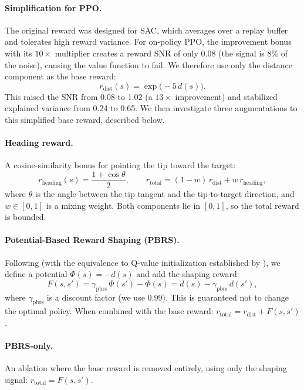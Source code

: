 \documentclass[11pt]{article}
\begin{document}
\paragraph{Simplification for PPO.}
The original reward was designed for SAC, which averages over a replay buffer and tolerates high reward variance.
For on-policy PPO, the improvement bonus with its $10{\times}$ multiplier creates a reward SNR of only 0.08 (the signal is 8\% of the noise), causing the value function to fail.
We therefore use only the distance component as the base reward:
\begin{equation}
  r_{\text{dist}}(s) = \exp\!\bigl(-5\,d(s)\bigr).
  \label{eq:reward-dist}
\end{equation}
This raised the SNR from 0.08 to 1.02 (a $13{\times}$ improvement) and stabilized explained variance from 0.24 to 0.65.
We then investigate three augmentations to this simplified base reward, described below.

\paragraph{Heading reward.}
A cosine-similarity bonus for pointing the tip toward the target:
\begin{equation}
  r_{\text{heading}}(s) = \frac{1 + \cos\theta}{2}, \qquad
  r_{\text{total}} = (1-w)\,r_{\text{dist}} + w\,r_{\text{heading}},
  \label{eq:reward-heading}
\end{equation}
where $\theta$ is the angle between the tip tangent and the tip-to-target direction, and $w \in [0,1]$ is a mixing weight.
Both components lie in $[0,1]$, so the total reward is bounded.

\paragraph{Potential-Based Reward Shaping (PBRS).}
Following \citet{Ng1999} (with the equivalence to Q-value initialization established by \citet{Wiewiora2003}), we define a potential $\Phi(s) = -d(s)$ and add the shaping reward:
\begin{equation}
  F(s, s') = \gamma_{\text{pbrs}}\,\Phi(s') - \Phi(s) = d(s) - \gamma_{\text{pbrs}}\,d(s'),
  \label{eq:pbrs}
\end{equation}
where $\gamma_{\text{pbrs}}$ is a discount factor (we use 0.99).
This is guaranteed not to change the optimal policy.
When combined with the base reward: $r_{\text{total}} = r_{\text{dist}} + F(s,s')$.

\paragraph{PBRS-only.}
An ablation where the base reward is removed entirely, using only the shaping signal: $r_{\text{total}} = F(s,s')$.
\end{document}
